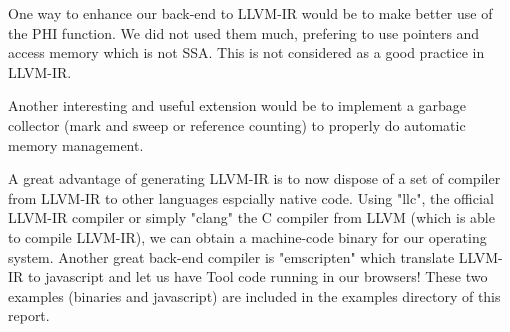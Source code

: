 One way to enhance our back-end to LLVM-IR would be to make better use of the PHI function. We did not used them much, prefering to use pointers and access memory which is not SSA. This is not considered as a good practice in LLVM-IR.

Another interesting and useful extension would be to implement a garbage collector (mark and sweep or reference counting) to properly do automatic memory management.

A great advantage of generating LLVM-IR is to now dispose of a set of compiler from LLVM-IR to other languages espcially native code. Using "llc", the official LLVM-IR compiler or simply "clang" the C compiler from LLVM (which is able to compile LLVM-IR), we can obtain a machine-code binary for our operating system. Another great back-end compiler is "emscripten" which translate LLVM-IR to javascript and let us have Tool code running in our browsers! These two examples (binaries and javascript) are included in the examples directory of this report.
